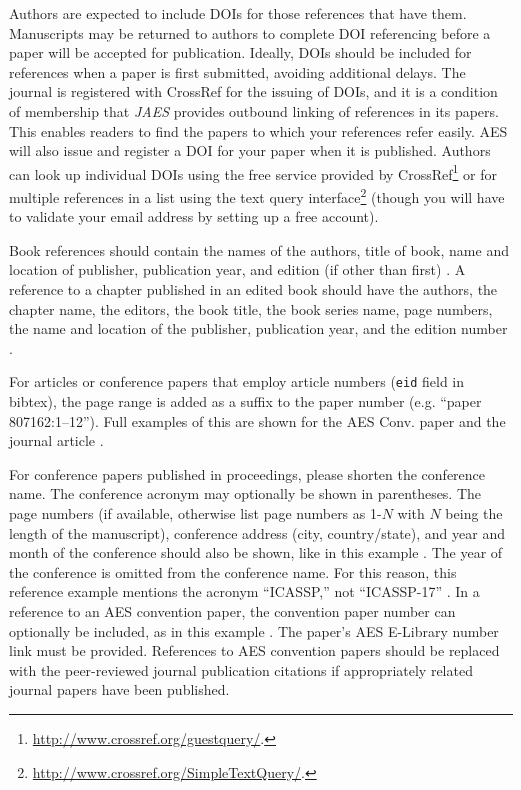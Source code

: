\documentclass[fleqn]{jaes}
\begin{document}
Authors are expected to include DOIs for those references that have them. Manuscripts may be returned to authors to complete DOI referencing before a paper will be accepted for publication. Ideally, DOIs should be included for references when a paper is first submitted, avoiding additional delays. The journal is registered with CrossRef for the issuing of DOIs, and it is a condition of membership that \textit{JAES} provides outbound linking of references in its papers. This enables readers to find the papers to which your references refer easily. AES will also issue and register a DOI for your paper when it is published. Authors can look up individual DOIs using the free service provided by CrossRef\footnote{\url{http://www.crossref.org/guestquery/}.} or for multiple references in a list using the text query interface\footnote{\url{http://www.crossref.org/SimpleTextQuery/}.} (though you will have to validate your email address by setting up a free account).

Book references should contain the names of the authors, title of book, name and location of publisher, publication year, and edition (if other than first) \cite{a_book_ref, a_book_ref_2nd_edition}. A reference to a chapter published in an edited book should have the authors, the chapter name, the editors, the book title, the book series name, page numbers, the name and location of the publisher, publication year, and the edition number \cite{a_book_chapter}. 

For articles or conference papers that employ article numbers (\texttt{eid} field in bibtex), the page range is added as a suffix to the paper number (e.g. ``paper 807162:1–12''). Full examples of this are shown for the AES Conv. paper \cite{AES_convention_paper} and the journal article \cite{a_journal_paper_with_article_ID}.

For conference papers published in proceedings, please shorten the conference name. The conference acronym may optionally be shown in parentheses. The page numbers (if available, otherwise list page numbers as 1-$N$ with $N$ being the length of the manuscript), conference address (city, country/state), and year and month of the conference should also be shown, like in this example \cite{a_nonAESconference_paper}. The year of the conference is omitted from the conference name. For this reason, this reference example mentions the acronym ``ICASSP,'' not ``ICASSP-17'' \cite{a_nonAESconference_paper}. 
In a reference to an AES convention paper, the convention paper number can optionally be included, as in this example \cite{AES_convention_paper}. The paper's AES E-Library number link must be provided. References to AES convention papers should be replaced with the peer-reviewed journal publication citations if appropriately related journal papers have been published.
\end{document}

